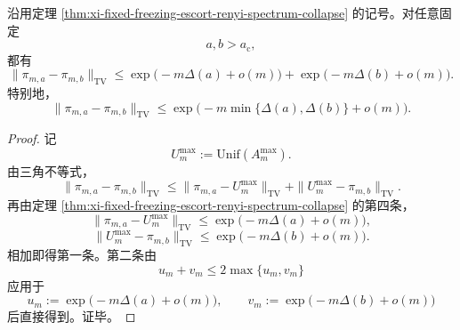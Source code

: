 \begin{corollary}\label{cor:xi-fixed-freezing-escort-pairwise-tv-coalescence}
沿用定理 \ref{thm:xi-fixed-freezing-escort-renyi-spectrum-collapse} 的记号。对任意固定
\[
a,b>a_{\mathrm c},
\]
都有
\[
\|\pi_{m,a}-\pi_{m,b}\|_{\mathrm{TV}}
\le
\exp\!\bigl(-m\Delta(a)+o(m)\bigr)
+
\exp\!\bigl(-m\Delta(b)+o(m)\bigr).
\]
特别地，
\[
\|\pi_{m,a}-\pi_{m,b}\|_{\mathrm{TV}}
\le
\exp\!\bigl(-m\min\{\Delta(a),\Delta(b)\}+o(m)\bigr).
\]
\end{corollary}
\begin{proof}
记
\[
U_m^{\max}:=\mathrm{Unif}(A_m^{\max}).
\]
由三角不等式，
\[
\|\pi_{m,a}-\pi_{m,b}\|_{\mathrm{TV}}
\le
\|\pi_{m,a}-U_m^{\max}\|_{\mathrm{TV}}
+
\|U_m^{\max}-\pi_{m,b}\|_{\mathrm{TV}}.
\]
再由定理 \ref{thm:xi-fixed-freezing-escort-renyi-spectrum-collapse} 的第四条，
\[
\|\pi_{m,a}-U_m^{\max}\|_{\mathrm{TV}}
\le
\exp\!\bigl(-m\Delta(a)+o(m)\bigr),
\]
\[
\|U_m^{\max}-\pi_{m,b}\|_{\mathrm{TV}}
\le
\exp\!\bigl(-m\Delta(b)+o(m)\bigr).
\]
相加即得第一条。第二条由
\[
u_m+v_m
\le
2\max\{u_m,v_m\}
\]
应用于
\[
u_m:=\exp\!\bigl(-m\Delta(a)+o(m)\bigr),
\qquad
v_m:=\exp\!\bigl(-m\Delta(b)+o(m)\bigr)
\]
后直接得到。证毕。
\end{proof}
